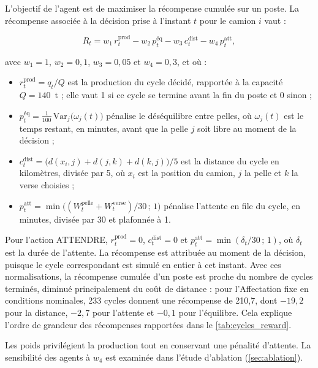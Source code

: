 \documentclass[11pt,a4paper]{article}
\newif\ifrevmarks
\newcommand{\revtag}[1]{\ifrevmarks\textsuperscript{\textcolor{red!70!black}{\scriptsize[#1]}}\fi}
\newenvironment{revbloc}[1]{\par\ifrevmarks\color{revcolor}\noindent\revtag{#1}\ \fi}{\par}
\begin{document}
\begin{revbloc}{M10}
L'objectif de l'agent est de maximiser la récompense cumulée sur un poste. La récompense associée à la décision prise à l'instant $t$ pour le camion $i$ vaut :

\begin{equation}
R_t = w_1\, r^{\mathrm{prod}}_t - w_2\, p^{\mathrm{éq}}_t - w_3\, c^{\mathrm{dist}}_t - w_4\, p^{\mathrm{att}}_t ,
\label{eq:reward}
\end{equation}

avec $w_1 = 1$, $w_2 = 0{,}1$, $w_3 = 0{,}05$ et $w_4 = 0{,}3$, et où :

\begin{itemize}
  \item $r^{\mathrm{prod}}_t = q_t / Q$ est la production du cycle décidé, rapportée à la capacité $Q = 140$~t ; elle vaut 1 si ce cycle se termine avant la fin du poste et 0 sinon ;
  \item $p^{\mathrm{éq}}_t = \frac{1}{100}\,\mathrm{Var}_j\big(\omega_j(t)\big)$ pénalise le déséquilibre entre pelles, où $\omega_j(t)$ est le temps restant, en minutes, avant que la pelle $j$ soit libre au moment de la décision ;
  \item $c^{\mathrm{dist}}_t = \big(d(x_i, j) + d(j, k) + d(k, j)\big)/5$ est la distance du cycle en kilomètres, divisée par 5, où $x_i$ est la position du camion, $j$ la pelle et $k$ la verse choisies ;
  \item $p^{\mathrm{att}}_t = \min\big((W^{\mathrm{pelle}}_t + W^{\mathrm{verse}}_t)/30\,;\,1\big)$ pénalise l'attente en file du cycle, en minutes, divisée par 30 et plafonnée à 1.
\end{itemize}

Pour l'action ATTENDRE, $r^{\mathrm{prod}}_t = 0$, $c^{\mathrm{dist}}_t = 0$ et $p^{\mathrm{att}}_t = \min(\delta_t/30\,;\,1)$, où $\delta_t$ est la durée de l'attente. La récompense est attribuée au moment de la décision, puisque le cycle correspondant est simulé en entier à cet instant. Avec ces normalisations, la récompense cumulée d'un poste est proche du nombre de cycles terminés, diminué principalement du coût de distance : pour l'Affectation fixe en conditions nominales, 233 cycles donnent une récompense de 210,7, dont $-19{,}2$ pour la distance, $-2{,}7$ pour l'attente et $-0{,}1$ pour l'équilibre. Cela explique l'ordre de grandeur des récompenses rapportées dans le \cref{tab:cycles_reward}.
\end{revbloc}

Les poids privilégient la production tout en conservant une pénalité d'attente. La sensibilité des agents à $w_4$ est examinée dans l'étude d'ablation (\cref{sec:ablation}).
\end{document}
